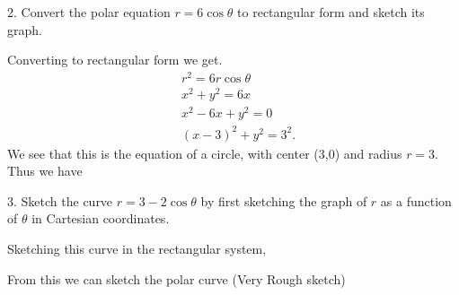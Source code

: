 \documentclass{report}
\begin{document}
    \pagebreak \bigbreak \noindent
    \begin{mdframed}
        2. Convert the polar equation $r=6\cos{\theta}$ to rectangular form and sketch its graph.
    \end{mdframed}
    Converting to rectangular form we get.
    \begin{align*}
        &r^{2} = 6r\cos{\theta } \\
        &x^{2} +y^{2} = 6x \\
        &x^{2} -6x + y^{2} = 0 \\
        &(x-3)^{2} + y^{2} = 3^{2}
    .\end{align*}
    We see that this is the equation of a circle, with center (3,0) and radius $r=3$. Thus we have
    \bigbreak \noindent 
\begin{figure}[ht]
    \centering
    \label{fig:circle2}
\end{figure}

    \pagebreak \bigbreak \noindent 
    \begin{mdframed}
        3. Sketch the curve $r=3-2\cos{\theta}$ by first sketching the graph of $r$ as a function of $\theta$ in Cartesian coordinates.
    \end{mdframed}
    \bigbreak \noindent 
    Sketching this curve in the rectangular system,
    \bigbreak \noindent 
    \begin{figure}[ht]
        \centering
        \label{fig:maneaan}
    \end{figure}

    \bigbreak \noindent 
    From this we can sketch the polar curve (Very Rough sketch)
    \bigbreak \noindent 
\begin{figure}[ht]
    \centering
    \label{fig:pkill2}
\end{figure}




     
 
\end{document}

